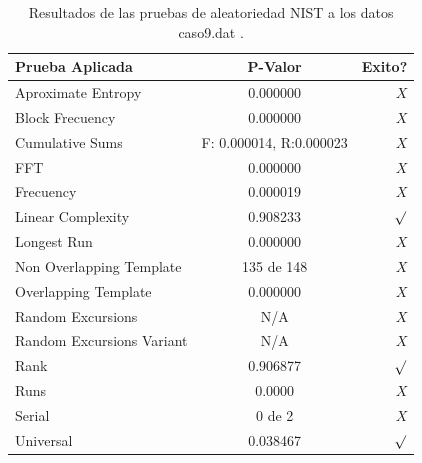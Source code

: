 \documentclass[10pt]{IEEEtran}
\begin{document}
\begin{table}[H]
\caption{Resultados de las pruebas de aleatoriedad NIST a los datos caso9.dat .}
\label{caso7}
\begin{center}
\begin{small}
\begin{tabular}{|l|c|r|}
\hline

Prueba Aplicada &  P-Valor & Exito? \\
\hline

Aproximate Entropy    &     0.000000 & $X$ \\

Block Frecuency  & 0.000000  &  $X$  \\

Cumulative Sums    &   F: 0.000014, R:0.000023   & $X$ \\

FFT    &   0.000000 &   $X$      \\

Frecuency     & 0.000019 &  $X$   \\

Linear Complexity      &  0.908233  & $\surd$ \\

Longest Run      &   0.000000 &   $X$     \\

Non Overlapping Template      & 135 de 148    &    $X$          \\

Overlapping Template      &    0.000000   &       $X$        \\

Random Excursions      & N/A  &    $X$      \\

Random Excursions Variant & N/A &     $X$    \\

Rank &  0.906877 &      $\surd$      \\

Runs &     0.0000  &       $X$      \\

Serial &     0 de 2    &     $X$        \\

Universal &        0.038467  &      $\surd$           \\

\hline

\end{tabular}
\end{small}
\end{center}
\end{table}
\end{document}
